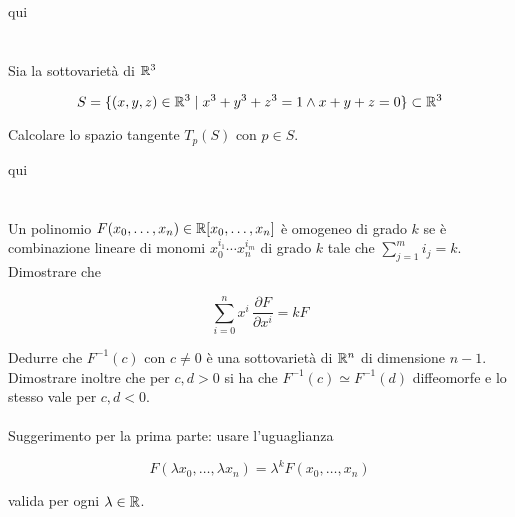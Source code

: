 qui

%

\newpage

%

\section{}\label{BONUS2-3}

\begin{tcolorbox}
	Sia la sottovarietà di $ \mathbb{R}^{3} $
	
	\begin{equation}
		S = \{ (x,y,z) \in \mathbb{R}^{3} \mid x^{3} + y^{3} + z^{3} = 1 \wedge x+y+z=0 \} \subset \mathbb{R}^{3}
	\end{equation}
	
	Calcolare lo spazio tangente $ T_{p}(S) $ con $ p \in S $.
\end{tcolorbox}

qui

%

\newpage

%

\section{}\label{es2-15}

\begin{tcolorbox}
	Un polinomio $ F(x_{0},\dots,x_{n}) \in \mathbb{R}[x_{0},\dots,x_{n}] $ è omogeneo di grado $ k $ se è combinazione lineare di monomi $ x_{0}^{i_{1}} \cdots x_{n}^{i_{m}} $ di grado $ k $ tale che $ \sum_{j=1}^{m} i_{j} = k $. Dimostrare che
	
	\begin{equation}
		\sum_{i=0}^{n} x^{i} \, \dfrac{\partial F}{\partial x^{i}} = k F
	\end{equation}
	
	Dedurre che $ F^{-1}(c) $ con $ c \neq 0 $ è una sottovarietà di $ \mathbb{R}^{n} $ di dimensione $ n-1 $. Dimostrare inoltre che per $ c,d>0 $ si ha che $ F^{-1}(c) \simeq F^{-1}(d) $ diffeomorfe e lo stesso vale per $ c,d<0 $.\\\\
	Suggerimento per la prima parte: usare l'uguaglianza
	
	\begin{equation}
		F(\lambda x_{0},\dots,\lambda x_{n}) = \lambda^{k} F(x_{0},\dots,x_{n})
	\end{equation}
	
	valida per ogni $ \lambda \in \mathbb{R} $.
\end{tcolorbox}

